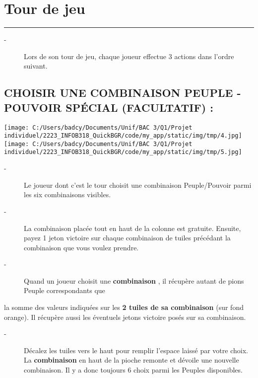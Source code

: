 \documentclass{scrartcl}%
\begin{document}
%
\section{ Tour de jeu
}%
\label{sec:Tourdejeu}%
\rule{18cm}{0.07cm}\break%
\begin{description}%
\item[{-} ]%
%
 Lors de son tour de jeu, chaque joueur effectue 3 actions dans l'ordre suivant.
%
\end{description}

%
\subsection{ CHOISIR UNE COMBINAISON PEUPLE {-} POUVOIR SPÉCIAL (FACULTATIF) :
}%
\label{subsec:CHOISIRUNECOMBINAISONPEUPLE{-}POUVOIRSPCIAL(FACULTATIF)}%
%
\texttt{[image: C:/Users/badcy/Documents/Unif/BAC 3/Q1/Projet individuel/2223\_INFOB318\_QuickBGR/code/my\_app/static/img/tmp/4.jpg]}%
%
\texttt{[image: C:/Users/badcy/Documents/Unif/BAC 3/Q1/Projet individuel/2223\_INFOB318\_QuickBGR/code/my\_app/static/img/tmp/5.jpg]}%

%
\begin{description}%
\item[{-} ]%
%
 Le joueur dont c'est le tour choisit une combinaison Peuple/Pouvoir parmi les six combinaisons visibles.
%
\item[{-} ]%
%
 La combinaison placée tout en haut de la colonne est gratuite. Ensuite, payez 1 jeton victoire sur chaque combinaison de tuiles précédant la combinaison que vous voulez prendre.
%
\item[{-} ]%
%
 Quand un joueur choisit une %
\textbf{combinaison}%
, il récupère autant de pions Peuple correspondants que
%
\end{description}%
la somme des valeurs indiquées sur les %
\textbf{2 tuiles de sa combinaison}%
\textit{ }%
 (sur fond orange). Il récupère aussi les éventuels jetons victoire posés sur sa combinaison.
%
\begin{description}%
\item[{-} ]%
%
 Décalez les tuiles vers le haut pour remplir l’espace laissé par votre choix. La %
\textbf{combinaison}%
\textit{ }%
 en haut de la pioche remonte et dévoile une nouvelle combinaison. Il y a donc toujours 6 choix parmi les Peuples disponibles.
%
\end{description}

%
\end{document}
